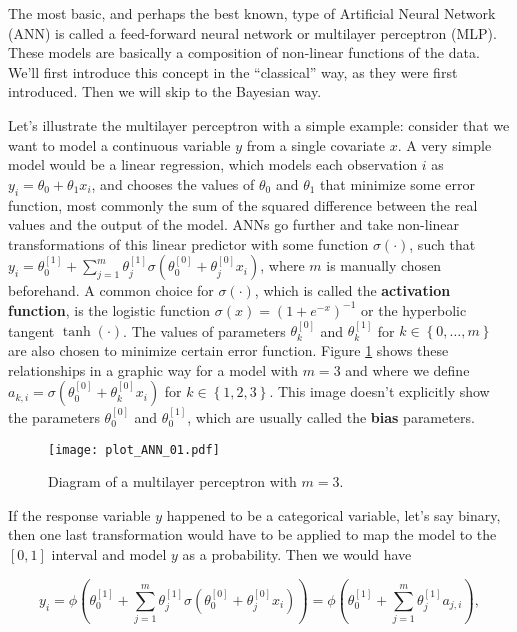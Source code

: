 The most basic, and perhaps the best known, type of Artificial Neural Network (ANN) is called a feed-forward neural network or multilayer perceptron (MLP). These models are basically a composition of non-linear functions of the data. We'll first introduce this concept in the ``classical'' way, as they were first introduced. Then we will skip to the Bayesian way.

Let's illustrate the multilayer perceptron with a simple example: consider that we want to model a continuous variable $y$ from a single covariate $x$. A very simple model would be a linear regression, which models each observation $i$ as $y_i = \theta_0 + \theta_1 x_i$, and chooses the values of $\theta_0$ and $\theta_1$ that minimize some error function, most commonly the sum of the squared difference between the real values and the output of the model. ANNs go further and take non-linear transformations of this linear predictor with some function $\sigma(\cdot)$, such that $y_i = \theta_0^{[1]} +  \sum_{j = 1}^m \theta_j^{[1]} \sigma \left( \theta_0^{[0]} + \theta_j^{[0]} x_i \right)$, where $m$ is manually chosen beforehand. A common choice for $\sigma(\cdot)$, which is called the \textbf{activation function}, is the logistic function $\sigma(x) = (1 + e^{-x})^{-1}$
or the hyperbolic tangent $\tanh(\cdot)$. The values of parameters $\theta_k^{[0]}$ and $\theta_k^{[1]}$ for $k \in \left\{ 0, \ldots, m \right\}$ are also chosen to minimize certain error function. Figure \ref{fig:theory_ANN_diagram_01} shows these relationships in a graphic way for a model with $m = 3$ and where we define $a_{k, i} = \sigma \left( \theta_0^{[0]} + \theta_k^{[0]} x_i \right)$ for $k \in \left\{ 1, 2, 3 \right\}$.
This image doesn't explicitly show the parameters $\theta_0^{[0]}$ and $\theta_0^{[1]}$, which are usually called the \textbf{bias} parameters.

\begin{figure}[H]
    \centering
    \texttt{[image: plot\_ANN\_01.pdf]}
    \caption{Diagram of a multilayer perceptron with $m = 3$.}
    \label{fig:theory_ANN_diagram_01}
\end{figure}

If the response variable $y$ happened to be a categorical variable, let's say binary, then one last transformation would have to be applied to map the model to the $\left[0, 1\right]$ interval and model $y$ as a probability. Then we would have

$$
  y_i =
  \phi \left( \theta_0^{[1]} +  \sum_{j = 1}^m \theta_j^{[1]} \sigma \left( \theta_0^{[0]} + \theta_j^{[0]} x_i \right) \right) =
  \phi \left( \theta_0^{[1]} +  \sum_{j = 1}^m \theta_j^{[1]} a_{j,i} \right),
$$

